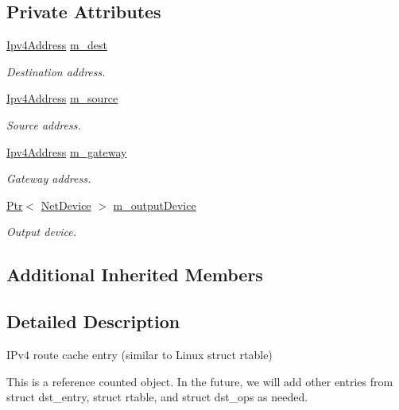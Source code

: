 \subsection*{Private Attributes}
\begin{DoxyCompactItemize}
\item 
\hyperlink{classns3_1_1Ipv4Address}{Ipv4\+Address} \hyperlink{classns3_1_1Ipv4Route_ae3e2adf8ec9354f4ee7144244a3b463f}{m\+\_\+dest}
\begin{DoxyCompactList}\small\item\em Destination address. \end{DoxyCompactList}\item 
\hyperlink{classns3_1_1Ipv4Address}{Ipv4\+Address} \hyperlink{classns3_1_1Ipv4Route_a261c5b08cf839944a45c7e1523e7433b}{m\+\_\+source}
\begin{DoxyCompactList}\small\item\em Source address. \end{DoxyCompactList}\item 
\hyperlink{classns3_1_1Ipv4Address}{Ipv4\+Address} \hyperlink{classns3_1_1Ipv4Route_a6b98415c6589abd13c79139a867fdfc3}{m\+\_\+gateway}
\begin{DoxyCompactList}\small\item\em Gateway address. \end{DoxyCompactList}\item 
\hyperlink{classns3_1_1Ptr}{Ptr}$<$ \hyperlink{classns3_1_1NetDevice}{Net\+Device} $>$ \hyperlink{classns3_1_1Ipv4Route_aaabe4495a5c4425d018d79b5fec1ba0c}{m\+\_\+output\+Device}
\begin{DoxyCompactList}\small\item\em Output device. \end{DoxyCompactList}\end{DoxyCompactItemize}
\subsection*{Additional Inherited Members}


\subsection{Detailed Description}
I\+Pv4 route cache entry (similar to Linux struct rtable) 

This is a reference counted object. In the future, we will add other entries from struct dst\+\_\+entry, struct rtable, and struct dst\+\_\+ops as needed. 

